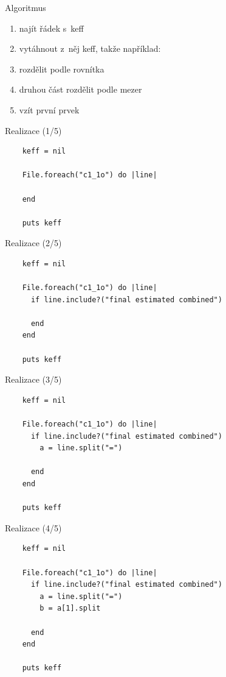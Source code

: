 \documentclass{beamer}
\begin{document}
\begin{frame}{Algoritmus}
  \begin{enumerate}
    \item najít řádek s~keff
    \pause
    \item vytáhnout z~něj keff, takže například:
    \pause
    \item rozdělit podle rovnítka
    \pause
    \item druhou část rozdělit podle mezer
    \pause
    \item vzít první prvek
  \end{enumerate}
\end{frame}


\begin{frame}[fragile]{Realizace (1/5)}
  \scriptsize
  \begin{verbatim}
    keff = nil

    File.foreach("c1_1o") do |line|

    end

    puts keff
  \end{verbatim}
\end{frame}

\begin{frame}[fragile]{Realizace (2/5)}
  \scriptsize
  \begin{verbatim}
    keff = nil

    File.foreach("c1_1o") do |line|
      if line.include?("final estimated combined")

      end
    end

    puts keff
  \end{verbatim}
\end{frame}

\begin{frame}[fragile]{Realizace (3/5)}
  \scriptsize
  \begin{verbatim}
    keff = nil

    File.foreach("c1_1o") do |line|
      if line.include?("final estimated combined")
        a = line.split("=")

      end
    end

    puts keff
  \end{verbatim}
\end{frame}

\begin{frame}[fragile]{Realizace (4/5)}
  \scriptsize
  \begin{verbatim}
    keff = nil

    File.foreach("c1_1o") do |line|
      if line.include?("final estimated combined")
        a = line.split("=")
        b = a[1].split

      end
    end

    puts keff
  \end{verbatim}
\end{frame}
\end{document}
